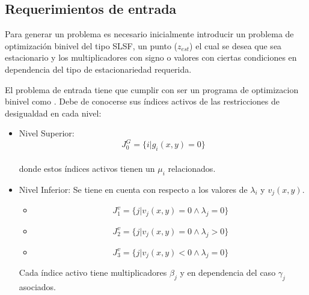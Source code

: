 \subsection{Requerimientos de entrada}

Para generar un problema es necesario inicialmente introducir un problema de optimización binivel del tipo SLSF, un punto ($z_{est}$) el cual
se desea que sea estacionario y los multiplicadores con signo o valores con ciertas condiciones en dependencia del tipo de estacionariedad requerida.

El problema de entrada tiene que cumplir con ser un programa de optimizacion binivel como . 
Debe de conocerse sus índices activos de las restricciones de desigualdad en cada nivel:
\begin{itemize}
    \item Nivel Superior:
            \begin{equation}
             J_0^G=\{i | g_i(x,y)=0\}
            \label{J_0_level_superior} %
            \end{equation}\\
    donde estos índices activos tienen un $\mu_i$ relacionados.
        
    \item Nivel Inferior:
                Se tiene en cuenta con respecto a los valores de $\lambda_i$ y $v_j(x,y)$.
                
                \begin{itemize}
                    \item \begin{equation}
                        J_1^v=\{j | v_j(x,y)=0 \land \lambda_j=0 \} %
                        \label{J_0_lambda_0_level_inferior}
                        \end{equation} 
                    \item \begin{equation}
                        J_2^v=\{j | v_j(x,y)=0 \land \lambda_j>0 \}
                        \label{J_0_lambda_pos_level_inferior}
                    \end{equation}
                    \item \begin{equation}
                        J_3^v=\{j | v_j(x,y)< 0 \land \lambda_j=0 \}
                        \label{J_neg_lambda_0_level_inferior}
                    \end{equation}
                \end{itemize}
    Cada índice activo tiene multiplicadores $\beta_j$ y en dependencia del caso $\gamma_j$ asociados.
\end{itemize}

